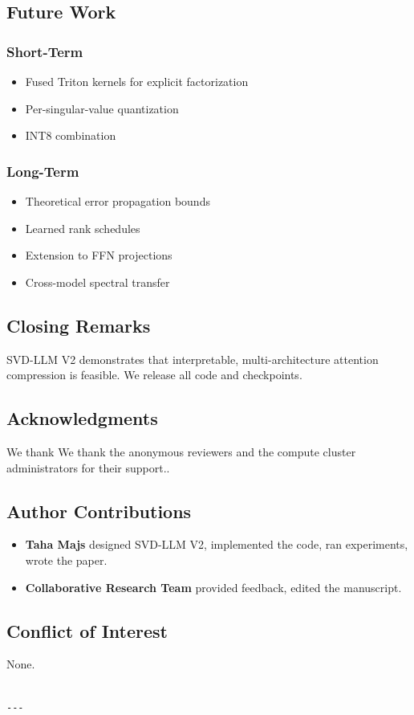 \subsection{Future Work}

\subsubsection{Short-Term}
\begin{itemize}
\item Fused Triton kernels for explicit factorization
\item Per-singular-value quantization
\item INT8 combination

\end{itemize}
\subsubsection{Long-Term}
\begin{itemize}
\item Theoretical error propagation bounds
\item Learned rank schedules
\item Extension to FFN projections
\item Cross-model spectral transfer

\end{itemize}
\subsection{Closing Remarks}

SVD-LLM V2 demonstrates that interpretable, multi-architecture attention 
compression is feasible. We release all code and checkpoints.

\subsection{Acknowledgments}

We thank We thank the anonymous reviewers and the compute cluster administrators for their support..

\subsection{Author Contributions}

\begin{itemize}
\item \textbf{Taha Majs} designed SVD-LLM V2, implemented the code, ran experiments,
  wrote the paper.
\item \textbf{Collaborative Research Team} provided feedback, edited the manuscript.

\end{itemize}
\subsection{Conflict of Interest}

None.
\begin{lstlisting}

---
\end{lstlisting}